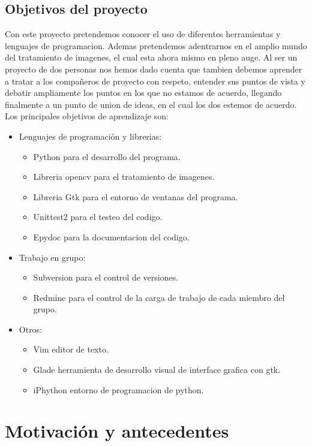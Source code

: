 \documentclass[12pt,a4paper]{report}
\begin{document}
\section{Objetivos del proyecto}
Con este proyecto pretendemos conocer el uso de diferentes herramientas y lenguajes de programacion. Ademas pretendemos adentrarnos en el amplio mundo del tratamiento de imagenes, el cual esta ahora mismo en pleno auge. Al ser un proyecto de dos personas nos hemos dado cuenta que tambien debemos aprender a tratar a los compañeros de proyecto con respeto, entender sus puntos de vista y debatir ampliamente los puntos en los que no estamos de acuerdo,  llegando finalmente a un punto de union de ideas, en el cual los dos estemos de acuerdo. Los principales objetivos de aprendizaje son:
\begin{itemize}
\item Lenguajes de programación y librerias:
	\begin{itemize}
	\item  Python para el desarrollo del programa.
	\item Libreria opencv para el tratamiento de imagenes.
	\item Libreria Gtk para el entorno de ventanas del programa.
	\item Unittest2 para el testeo del codigo.
	\item Epydoc para la documentacion del codigo.
	\end{itemize}
\item Trabajo en grupo: 
	\begin{itemize}
	\item Subversion para el control de versiones. 
	\item Redmine para el control de la carga de trabajo de cada miembro del grupo.
	\end{itemize}
\item Otros:
	\begin{itemize}
	\item Vim editor de texto.
	\item Glade herramienta de desarrollo visual de interface grafica con gtk.
	\item iPhython entorno de programacion de python.
	\end{itemize}  
	
\end{itemize}

 


\chapter{Motivación y antecedentes}
\end{document}
